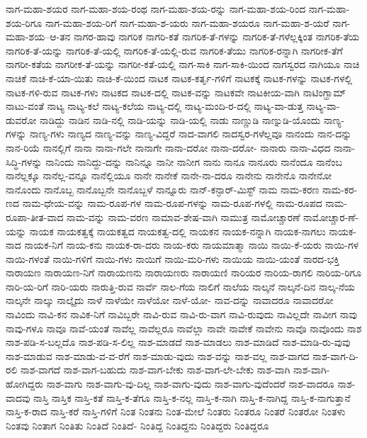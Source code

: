 {ನಾಗ-ಮಹಾ-ಶಯರ
ನಾಗ-ಮಹಾ-ಶಯ-ರಂಥ
ನಾಗ-ಮಹಾ-ಶಯ-ರನ್ನು
ನಾಗ-ಮಹಾ-ಶಯ-ರಿಂದ
ನಾಗ-ಮಹಾ-ಶಯ-ರಿಗೂ
ನಾಗ-ಮಹಾ-ಶಯ-ರಿಗೆ
ನಾಗ-ಮಹಾ-ಶ-ಯರು
ನಾಗ-ಮಹಾ-ಶಯರೂ
ನಾಗ-ಮಹಾ-ಶ-ಯರೆ
ನಾಗ-ಮಹಾ-ಶಯ--ಆ-ತನ
ನಾಗರ-ಹಾವು
ನಾಗರಿಕ
ನಾಗರಿ-ಕತೆ
ನಾಗರಿಕ-ತೆ-ಗಳನ್ನು
ನಾಗರಿಕ-ತೆ-ಗಳೆಲ್ಲಕ್ಕಿಂತ
ನಾಗರಿಕ-ತೆಯ
ನಾಗರಿಕ-ತೆ-ಯನ್ನು
ನಾಗರಿಕ-ತೆ-ಯಲ್ಲಿ
ನಾಗರಿಕ-ತೆ-ಯಲ್ಲಿ-ರುವ
ನಾಗರಿಕ-ತೆಯು
ನಾಗರಿಕ-ರನ್ನಾಗಿ
ನಾಗರೀಕ-ತೆಗೆ
ನಾಗರೀ-ಕತೆಯ
ನಾಗರೀಕ-ತೆ-ಯನ್ನು
ನಾಗರೀ-ಕತೆ-ಯಲ್ಲಿ
ನಾಗ-ಸಾಕಿ
ನಾಗ-ಸಾಕಿ-ಯಿಂದ
ನಾಗಸ್ವರದ
ನಾಗಿಯೂ
ನಾಚಿ
ನಾಚಿಕೆ
ನಾಚಿ-ಕೆ-ಯಾ-ಯಿತು
ನಾಚಿ-ಕೆ-ಯಿಂದ
ನಾಟಕ
ನಾಟಕ-ಕರ್ತೃ-ಗಳಿಗೆ
ನಾಟಕಕ್ಕೆ
ನಾಟಕ-ಗಳನ್ನು
ನಾಟಕ-ಗಳಲ್ಲಿ
ನಾಟಕ-ಗಳಿ-ರುವ
ನಾಟಕ-ಗಳು
ನಾಟಕದ
ನಾಟಕ-ದಲ್ಲಿ
ನಾಟಕ-ವನ್ನು
ನಾಟಕವೇ
ನಾಟಕೀಯ-ವಾಗಿ
ನಾಟಿಂಗ್ಹಾಮ್
ನಾಟು-ವಂತೆ
ನಾಟ್ಯ
ನಾಟ್ಯ-ಕಲೆ
ನಾಟ್ಯ-ಕಲೆಯ
ನಾಟ್ಯ-ದಲ್ಲಿ
ನಾಟ್ಯ-ಮಂದಿ-ರ-ದಲ್ಲಿ
ನಾಟ್ಯ-ವಾ-ಡುತ್ತ
ನಾಟ್ಯ-ವಾ-ಡುವರೋ
ನಾಡಿದ್ದು
ನಾಡಿನ
ನಾಡಿ-ನಲ್ಲಿ
ನಾಡಿ-ಯನ್ನು
ನಾಡಿ-ಯಲ್ಲಿ
ನಾಡು
ನಾಣ್ಣುಡಿ
ನಾಣ್ನುಡಿ-ಯೊಂದು
ನಾಣ್ಯ-ಗಳನ್ನು
ನಾಣ್ಯ-ಗಳು
ನಾಣ್ಯದ
ನಾಣ್ಯ-ವನ್ನು
ನಾಣ್ಯ-ವಿದ್ದರೆ
ನಾದ-ವಾಗಲಿ
ನಾದಸ್ವರ-ಗಳೆಲ್ಲವೂ
ನಾನಂದು
ನಾನ-ದನ್ನು
ನಾನ-ರಿಯೆ
ನಾನಲ್ಲಿಗೆ
ನಾನಾ
ನಾನಾ-ಗಲೇ
ನಾನಾಗೇ
ನಾನಾ-ದರೋ
ನಾನಾ-ದರೋ-
ನಾನಾರು
ನಾನಾ-ವಿಧದ
ನಾನಾ-ಸಿದ್ಧಿ-ಗಳನ್ನು
ನಾನಿಂದು
ನಾನಿದ್ದು-ದನ್ನು
ನಾನಿನ್ನೂ
ನಾನೀ
ನಾನೀಗ
ನಾನು
ನಾನೂ
ನಾನೂರು
ನಾನೆಂದೂ
ನಾನೆಂಬ
ನಾನೆಲ್ಲಕ್ಕೂ
ನಾನೆಲ್ಲ-ವನ್ನೂ
ನಾನೆಲ್ಲಿಯೂ
ನಾನೇ
ನಾನೇಕೆ
ನಾನೇ-ನಾ-ದರೂ
ನಾನೇನು
ನಾನೇನೊ
ನಾನೇನೋ
ನಾನೊಂದು
ನಾನೊಬ್ಬ
ನಾನೊಬ್ಬನೇ
ನಾನೊಬ್ಬಳೆ
ನಾನ್ನೂರು
ನಾನ್-ಕನ್ಫಾರ್-ಮಿಸ್ಟ್
ನಾಮ
ನಾಮ-ಕರಣ
ನಾಮ-ಕರ-ಣದ
ನಾಮ-ಧೇಯ-ವನ್ನು
ನಾಮ-ರೂಪ-ಗಳ
ನಾಮ-ರೂಪ-ಗಳನ್ನು
ನಾಮ-ರೂಪ-ಗಳಲ್ಲಿ
ನಾಮ-ರೂಪದ
ನಾಮ-ರೂಪಾ-ತೀತ-ವಾದ
ನಾಮ-ವನ್ನು
ನಾಮ-ವರಣ
ನಾಮಾವ-ಶೇಷ-ವಾಗಿ
ನಾಮುತ್ರ
ನಾಮೋಚ್ಚಾರಣೆ
ನಾಮೋಚ್ಚಾರ-ಣೆ-ಯನ್ನು
ನಾಯಕ
ನಾಯಕತ್ವಕ್ಕೆ
ನಾಯಕತ್ವದ
ನಾಯಕತ್ವ-ದಲ್ಲಿ
ನಾಯಕನ
ನಾಯಕ-ನನ್ನಾಗಿ
ನಾಯಕ-ನಾಗಲು
ನಾಯಕ-ನಾದ
ನಾಯಕ-ನಿಗೆ
ನಾಯ-ಕನು
ನಾಯಕ-ರಾ-ದರು
ನಾಯ-ಕರು
ನಾಯಮಾತ್ಮಾ
ನಾಯಿ
ನಾಯಿ-ಕೆ-ಯರು
ನಾಯಿ-ಗಳ
ನಾಯಿ-ಗಳಂತೆ
ನಾಯಿ-ಗಳಿಗೆ
ನಾಯಿ-ಗಳು
ನಾಯಿಗೆ
ನಾಯಿ-ಮರಿ-ಗಳು
ನಾಯಿಯ
ನಾಯಿ-ಯಂತೆ
ನಾರದ-ಭಕ್ತಿ
ನಾರಾಯಣ
ನಾರಾಯಣ-ನಿಗೆ
ನಾರಾಯಣನು
ನಾರಾಯಣರು
ನಾರಾಯಣಿ
ನಾರಿಯರ
ನಾರಿಯ-ರಾಗಲಿ
ನಾರಿಯ-ರಿಗೂ
ನಾರಿ-ಯ-ರಿಗೆ
ನಾರಿ-ಯರು
ನಾರುತ್ತಿ-ರುವ
ನಾರ್ವೆ
ನಾಲ-ಗೆಯ
ನಾಲಿಗೆ
ನಾಲೆಯ
ನಾಲ್ಕನೆ
ನಾಲ್ಕನೆ-ದಿನ
ನಾಲ್ಕ-ನೆಯ
ನಾಲ್ಕನೇ
ನಾಲ್ಕು
ನಾಲ್ಕೈದು
ನಾಳೆ
ನಾಳೆಯೇ
ನಾಳೆಯೋ
ನಾಳೆ-ಯೋ-
ನಾವ-ದನ್ನು
ನಾವಾದರೂ
ನಾವಾದರೋ
ನಾವಿಂದು
ನಾವಿ-ಕನ
ನಾವಿಕ-ನಿಗೆ
ನಾವಿಬ್ಬರೇ
ನಾವಿ-ರುವ
ನಾವಿ-ರು-ವಾಗ
ನಾವಿ-ರುವುದು
ನಾವಿಲ್ಲದೇ
ನಾವೀಗ
ನಾವು
ನಾವು-ಗಳೂ
ನಾವೂ
ನಾವೆ-ಯಂತೆ
ನಾವೆಲ್ಲ
ನಾವೆಲ್ಲರೂ
ನಾವೆಲ್ಲಾ
ನಾವೇ
ನಾವೇಕೆ
ನಾವೇನು
ನಾವೊ
ನಾವೊಂದು
ನಾಶ
ನಾಶ-ಪಡಿ-ಸ-ಬಲ್ಲದೊ
ನಾಶ-ಪಡಿ-ಸ-ಲಿಲ್ಲ
ನಾಶ-ಮಾಡದೆ
ನಾಶ-ಮಾಡಲು
ನಾಶ-ಮಾಡಿದೆ
ನಾಶ-ಮಾಡಿ-ರು-ವುವು
ನಾಶ-ಮಾಡುವ
ನಾಶ-ಮಾಡು-ವ-ವ-ರೆಗೆ
ನಾಶ-ಮಾಡು-ವುದು
ನಾಶ-ವನ್ನು
ನಾಶ-ವಲ್ಲ
ನಾಶ-ವಾಗದ
ನಾಶ-ವಾಗ-ದಿ-ರಲಿ
ನಾಶ-ವಾಗದೆ
ನಾಶ-ವಾಗ-ಬಹುದು
ನಾಶ-ವಾಗ-ಬೇಕು
ನಾಶ-ವಾಗ-ಲೇ-ಬೇಕು
ನಾಶ-ವಾಗಿ
ನಾಶ-ವಾಗಿ-ಹೋಗಿದ್ದರು
ನಾಶ-ವಾಗು
ನಾಶ-ವಾಗು-ವು-ದಿಲ್ಲ
ನಾಶ-ವಾಗು-ವುದು
ನಾಶ-ವಾಗು-ವುದೆಂದರೆ
ನಾಶ-ವಾದರೂ
ನಾಶ-ವಾದವು
ನಾಸ್ತಿ
ನಾಸ್ತಿಕ
ನಾಸ್ತಿ-ಕತೆ
ನಾಸ್ತಿ-ಕ-ತೆಗೂ
ನಾಸ್ತಿ-ಕ-ನಲ್ಲ
ನಾಸ್ತಿ-ಕ-ನಾಗಿ
ನಾಸ್ತಿ-ಕ-ನಾಗಿದ್ದ
ನಾಸ್ತಿ-ಕ-ನಾಗುತ್ತಾನೆ
ನಾಸ್ತಿ-ಕ-ರಾದ
ನಾಸ್ತಿ-ಕರೆ
ನಾಸ್ತಿ-ಗಳಿಗೆ
ನಿಂತ
ನಿಂತನು
ನಿಂತ-ಮೇಲೆ
ನಿಂತರು
ನಿಂತರೂ
ನಿಂತರೆ
ನಿಂತರೋ
ನಿಂತಳು
ನಿಂತವು
ನಿಂತಾಗ
ನಿಂತಿತು
ನಿಂತಿದೆ
ನಿಂತಿದೆ-
ನಿಂತಿದ್ದ
ನಿಂತಿದ್ದನು
ನಿಂತಿದ್ದರು
ನಿಂತಿದ್ದರೂ
}
